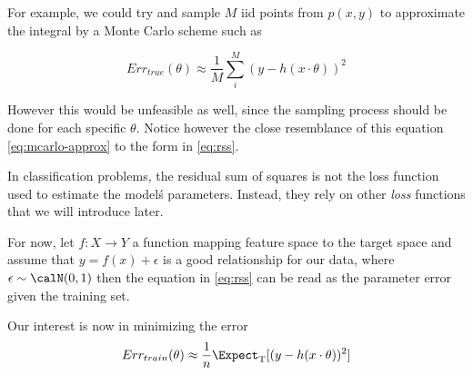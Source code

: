 For example, we could try and sample $M$ iid points from $p(x,y)$ to approximate the integral by a Monte Carlo scheme such as 

\begin{equation} \label{eq:mcarlo-approx}
    Err_{true}(\theta)  \approx \frac{1}{M} \sum_i^M ( y - h(x \cdot \theta) )^2
\end{equation}

However this would be unfeasible as well, since the sampling process should be done for each specific $\theta$. Notice however the close resemblance of this equation \ref{eq:mcarlo-approx} to the form in \ref{eq:rss}. 

In classification problems, the residual sum of squares is not the loss function used to estimate the model\'s parameters. Instead, they rely on other \textit{loss} functions that we will introduce later.

For now, let $f: X \rightarrow Y$ a function mapping feature space to the target space and assume that $y  =  f(x)  +  \epsilon $ is a good relationship for our data, where $\epsilon \sim \calN(0,1) $ then the equation in \ref{eq:rss} can be read as the parameter error given the training set.

Our interest is now in minimizing the error
\[
Err_{train}(\theta) \approx \frac{1}{n} \Expect_{ \mathrm{T}}[(y - h(x \cdot \theta) )^2]
\]


